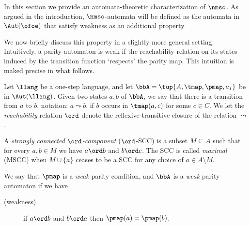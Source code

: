 

In this section we provide an automata-theoretic characterization of $\nmso$.
As argued in the introduction, $\nmso$-automata will be defined as the
automata in $\Aut(\ofoe)$ that satisfy weakness as an additional property

We now briefly discuss this property in a slightly more general setting. Intuitively, a parity automaton is weak if the  reachability relation on its states induced by the transition function `respects' the parity map. This intuition is maked precise in what follows.

\begin{definition}
\label{def:weak}
Let $\llang$ be a one-step language, and let $\bbA = \tup{A,\tmap,\pmap,a_I}$
be in $\Aut(\llang)$.
Given two states $a,b$ of $\bbA$,
we say that there is a transition from $a$ to $b$, notation: $a \leadsto b$,
if $b$ occurs in $\tmap(a,c)$ for some $c \in C$.
We let the \emph{reachability} relation $\ord$ denote the reflexive-transitive
closure of the relation $\leadsto$.

A \emph{strongly connected $\ord$-component} ($\ord$-SCC) is a subset $M\subseteq A$ such that for every $a,b \in M$ we have $a \ord b$ and $b \ord c$. The SCC is called \emph{maximal} (MSCC) when $M\cup\{a\}$ ceases to be a SCC for any choice of $a \in A\setminus M$.

We say that $\pmap$ is a \emph{weak} parity condition, and $\bbA$ is a
\emph{weak} parity automaton if we have
\begin{description}
\item[(weakness)] if $a \ord b$ and $b \ord a$ then $\pmap(a) = \pmap(b)$.
\end{description}
\end{definition}
\begin{comment}
\btbs
\item
story: weakness corresponds to noetherian projection
\item
Ex: \eqref{eq-wfmso} in introduction states that over the class of all
trees, the weak $\ofoe$-automata correspond to the $\mso$-variant
$\nmso$, where quantification is restricted to noetherian subsets.
\etbs
\end{comment}



